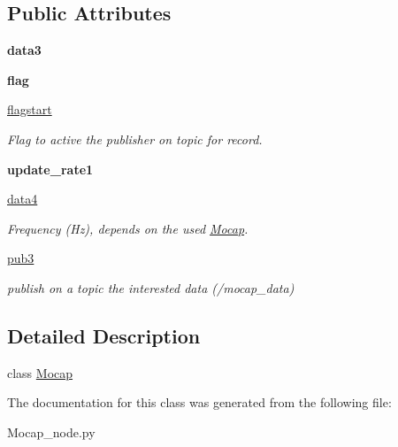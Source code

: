 \subsection*{Public Attributes}
\begin{DoxyCompactItemize}
\item 
{\bfseries data3}\hypertarget{classMocap__node_1_1Mocap_a77a5eae231614fb9287c311ba6240184}{}\label{classMocap__node_1_1Mocap_a77a5eae231614fb9287c311ba6240184}

\item 
{\bfseries flag}\hypertarget{classMocap__node_1_1Mocap_ad43768099eeb9d60be96078d0cd92cbf}{}\label{classMocap__node_1_1Mocap_ad43768099eeb9d60be96078d0cd92cbf}

\item 
\hyperlink{classMocap__node_1_1Mocap_ab12db5ec1a825bf042d8ad2e82e80116}{flagstart}\hypertarget{classMocap__node_1_1Mocap_ab12db5ec1a825bf042d8ad2e82e80116}{}\label{classMocap__node_1_1Mocap_ab12db5ec1a825bf042d8ad2e82e80116}

\begin{DoxyCompactList}\small\item\em Flag to active the publisher on topic for record. \end{DoxyCompactList}\item 
{\bfseries update\+\_\+rate1}\hypertarget{classMocap__node_1_1Mocap_a58f3c6bbac40bb808d8b4749fcbb0f05}{}\label{classMocap__node_1_1Mocap_a58f3c6bbac40bb808d8b4749fcbb0f05}

\item 
\hyperlink{classMocap__node_1_1Mocap_ac2f9f0ba96350cb83904e470e52a4c61}{data4}\hypertarget{classMocap__node_1_1Mocap_ac2f9f0ba96350cb83904e470e52a4c61}{}\label{classMocap__node_1_1Mocap_ac2f9f0ba96350cb83904e470e52a4c61}

\begin{DoxyCompactList}\small\item\em Frequency (Hz), depends on the used \hyperlink{classMocap__node_1_1Mocap}{Mocap}. \end{DoxyCompactList}\item 
\hyperlink{classMocap__node_1_1Mocap_a4023cc02b52de1a4da63578b5d567990}{pub3}\hypertarget{classMocap__node_1_1Mocap_a4023cc02b52de1a4da63578b5d567990}{}\label{classMocap__node_1_1Mocap_a4023cc02b52de1a4da63578b5d567990}

\begin{DoxyCompactList}\small\item\em publish on a topic the interested data (\textquotesingle{}/mocap\+\_\+data\textquotesingle{}) \end{DoxyCompactList}\end{DoxyCompactItemize}


\subsection{Detailed Description}
class \hyperlink{classMocap__node_1_1Mocap}{Mocap} 

The documentation for this class was generated from the following file\+:\begin{DoxyCompactItemize}
\item 
Mocap\+\_\+node.\+py\end{DoxyCompactItemize}
